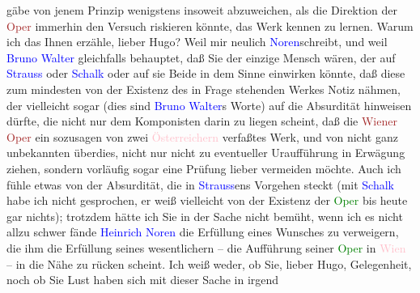               gäbe von jenem Prinzip wenigstens insoweit abzuweichen, als die Direktion der \textcolor{brown}{Oper}{}\ledrightnote{\textcolor{brown}{Staatsoper}} immerhin den Versuch riskieren könnte, das Werk
               kennen zu lernen. Warum ich das Ihnen erzähle, lieber Hugo? Weil mir neulich \textcolor{blue}{Noren}{}\ledrightnote{\textcolor{blue}{Heinrich Noren}}{ }schreibt, und weil \textcolor{blue}{Bruno Walter}{}\ledrightnote{\textcolor{blue}{Bruno Walter}} gleichfalls behauptet, daß Sie der einzige Mensch wären, der
               auf \textcolor{blue}{Strauss}{}\ledrightnote{\textcolor{blue}{Richard Strauss}} oder \textcolor{blue}{Schalk}{}\ledrightnote{\textcolor{blue}{Franz Schalk}} oder auf sie Beide in dem Sinne einwirken könnte, daß diese zum
               mindesten von der Existenz des in Frage stehenden Werkes Notiz nähmen, der vielleicht
               sogar (dies sind \textcolor{blue}{Bruno Walter}{}\ledrightnote{\textcolor{blue}{Bruno Walter}}s Worte) auf die
               Absurdität hinweisen dürfte, die nicht nur dem Komponisten darin zu liegen scheint,
               daß die \textcolor{brown}{Wiener Oper}{}\ledrightnote{\textcolor{brown}{Staatsoper}} ein sozusagen von zwei \textcolor{pink}{Österreichern}{}\ledrightnote{\textcolor{pink}{Österreich}} verfaßtes Werk, und von nicht ganz
               unbekannten überdies, nicht nur nicht zu eventueller Uraufführung in Erwägung ziehen,
               sondern vorläufig sogar eine Prüfung lieber vermeiden möchte. Auch ich fühle etwas
               von der Absurdität, die in \textcolor{blue}{Strauss}{}\ledrightnote{\textcolor{blue}{Richard Strauss}}ens Vorgehen
               steckt (mit \textcolor{blue}{Schalk}{}\ledrightnote{\textcolor{blue}{Franz Schalk}} habe ich nicht gesprochen, er
               weiß vielleicht von der Existenz der \textcolor{green}{Oper}{} bis heute gar nichts); trotzdem hätte ich Sie in der Sache nicht
               bemüht, wenn ich es nicht allzu schwer fände \textcolor{blue}{Heinrich
                  Noren}{}\ledrightnote{\textcolor{blue}{Heinrich Noren}} die Erfüllung eines Wunsches zu verweigern, die ihm die Erfüllung
               seines wesent{\pb}lichern – die Aufführung seiner
                  \textcolor{green}{Oper}{} in \textcolor{pink}{Wien}{}\ledrightnote{\textcolor{pink}{Wien}} – in die Nähe zu rücken scheint. Ich weiß weder, ob Sie,
               lieber Hugo, Gelegenheit, noch ob Sie Lust haben sich mit dieser Sache in irgend
